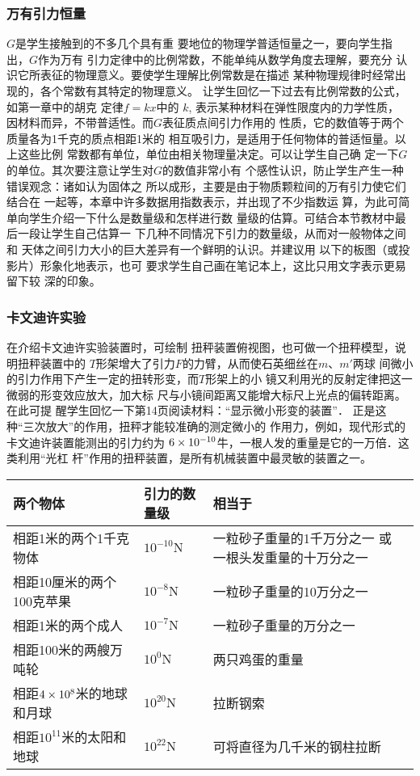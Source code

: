 \subsubsection{万有引力恒量} 
$G$是学生接触到的不多几个具有重
要地位的物理学普适恒量之一，要向学生指出，$G$作为万有
引力定律中的比例常数，不能单纯从数学角度去理解，要充分
认识它所表征的物理意义。要使学生理解比例常数是在描述
某种物理规律时经常出现的，各个常数有其特定的物理意义。
让学生回忆一下过去有比例常数的公式，如第一章中的胡克
定律$f=kx$中的 $k$, 表示某种材料在弹性限度内的力学性质，
因材料而异，不带普适性。而$G$表征质点间引力作用的
性质，它的数值等于两个质量各为1千克的质点相距1米的
相互吸引力，是适用于任何物体的普适恒量。以上这些比例
常数都有单位，单位由相关物理量决定。可以让学生自己确
定一下$G$的单位。其次要注意让学生对$G$的数值非常小有
个感性认识，防止学生产生一种错误观念：诸如认为固体之
所以成形，主要是由于物质颗粒间的万有引力使它们结合在
一起等，本章中许多数据用指数表示，并出现了不少指数运
算，为此可简单向学生介绍一下什么是数量级和怎样进行数
量级的估算。可结合本节教材中最后一段让学生自己估算一
下几种不同情况下引力的数量级，从而对一般物体之间和
天体之间引力大小的巨大差异有一个鲜明的认识。并建议用
以下的板图（或投影片）形象化地表示，也可
要求学生自己画在笔记本上，这比只用文字表示更易留下较
深的印象。

\subsubsection{卡文迪许实验}

在介绍卡文迪许实验装置时，可绘制
扭秤装置俯视图，也可做一个扭秤模型，说明扭秤装置中的
$T$形架增大了引力$F$的力臂，从而使石英细丝在$m$、$m'$两球
间微小的引力作用下产生一定的扭转形变，而$T$形架上的小
镜又利用光的反射定律把这一微弱的形变效应放大，加大标
尺与小镜间距离又能增大标尺上光点的偏转距离。在此可提
醒学生回忆一下第14页阅读材料：“显示微小形变的装置”．
正是这种“三次放大”的作用，扭秤才能较准确的测定微小的
作用力，例如，现代形式的卡文迪许装置能测出的引力约为
$6\times10^{-10}$牛，一根人发的重量是它的一万倍．这类利用“光杠
杆”作用的扭秤装置，是所有机械装置中最灵敏的装置之一。

\begin{center}
\begin{tabular}{p{}p{}p{}}
    \hline
    两个物体 &引力的数量级 &相当于\\
    \hline
相距1米的两个1千克物体 & $10^{-10}$N  &  一粒砂子重量的1千万分之一 或 一根头发重量的十万分之一\\
相距10厘米的两个100克苹果 & $10^{-8}$N  &  一粒砂子重量的10万分之一\\
相距1米的两个成人 & $10^{-7}$N  &  一粒砂子重量的万分之一\\
相距100米的两艘万吨轮 & $10^0$N  &  两只鸡蛋的重量\\
相距$4\times 10^8$米的地球和月球 & $10^{20}$N  & 拉断钢索\\
相距$10^{11}$米的太阳和地球 & $10^{22}$N  &  可将直径为几千米的钢柱拉断\\
    \hline
\end{tabular}
\end{center}

